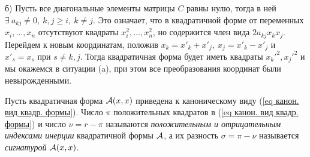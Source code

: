\begin{proofocre}
\begin{enumerate}
\begin{enumerate}
        б) Пусть все диагональные элементы матрицы $C$ равны нулю, тогда в ней $\exists~a_{kj}\neq 0,~k,j\ge i,~k\neq j$. Это означает, что в квадратичной форме от переменных $x_i,\ldots,x_n$ отсутствуют квадраты $x_i^2,\ldots,x_n^2$, но содержится член вида $2a_{kj}x_kx_j$. Перейдем к новым координатам, положив $x_k=x'_k+x'_j,~x_j=x'_k-x'_j$ и $x'_s=x_s$ при $s\neq k,j$. Тогда квадратичная форма будет иметь квадраты ${x_k'}^2,{x_j'}^2$ и мы окажемся в ситуации (a), при этом все преобразования координат были невырожденными.
    \end{enumerate}
\end{enumerate}
\end{proofocre}

\begin{definition}
Пусть квадратичная форма ${\mathcal{A}}(x,x)$ приведена к каноническому виду (\eqref{eq канон. вид квадр. формы}). Число $\pi$ положительных квадратов в (\eqref{eq канон. вид квадр. формы}) и число $\nu=r-\pi$ называются \emph{положительным и отрицательным индексами инерции} квадратичной формы ${\mathcal{A}}$, а их разность $\sigma=\pi-\nu$ называется \emph{сигнатурой} ${\mathcal{A}}(x,x)$.
\end{definition}

